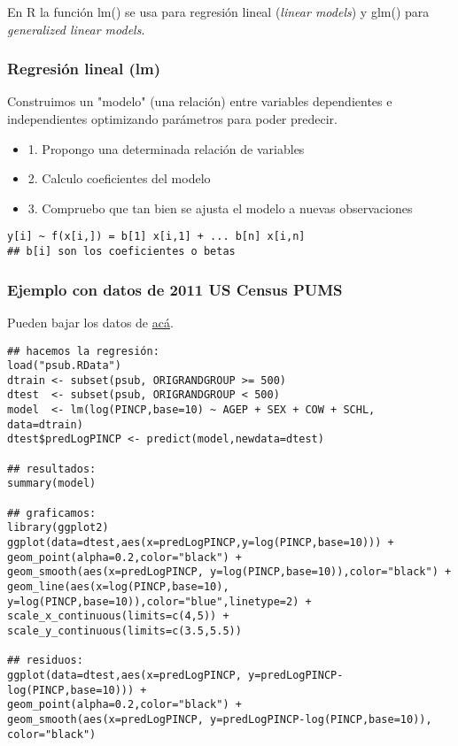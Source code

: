 \documentclass[11pt]{article}
\begin{document}
En R la función lm() se usa para regresión lineal (\emph{linear models}) y glm() para \emph{generalized linear models}.
\subsubsection*{Regresión lineal (lm)}
\label{sec:orgb3bc457}
Construimos un "modelo" (una relación) entre variables dependientes e independientes optimizando
parámetros para poder predecir.

\begin{itemize}
\item 1. Propongo una determinada relación de variables
\item 2. Calculo coeficientes del modelo
\item 3. Compruebo que tan bien se ajusta el modelo a nuevas observaciones
\end{itemize}

\begin{verbatim}
y[i] ~ f(x[i,]) = b[1] x[i,1] + ... b[n] x[i,n]
## b[i] son los coeficientes o betas
\end{verbatim}

\subsubsection*{Ejemplo con datos de 2011 US Census PUMS}
\label{sec:org3a5c616}

Pueden bajar los datos de \href{https://github.com/WinVector/zmPDSwR/raw/master/PUMS/psub.RData}{acá}.

\begin{verbatim}
## hacemos la regresión:
load("psub.RData")
dtrain <- subset(psub, ORIGRANDGROUP >= 500)
dtest  <- subset(psub, ORIGRANDGROUP < 500)
model  <- lm(log(PINCP,base=10) ~ AGEP + SEX + COW + SCHL, data=dtrain) 
dtest$predLogPINCP <- predict(model,newdata=dtest) 

## resultados:
summary(model)

## graficamos:
library(ggplot2)
ggplot(data=dtest,aes(x=predLogPINCP,y=log(PINCP,base=10))) + geom_point(alpha=0.2,color="black") + 
geom_smooth(aes(x=predLogPINCP, y=log(PINCP,base=10)),color="black") +
geom_line(aes(x=log(PINCP,base=10), y=log(PINCP,base=10)),color="blue",linetype=2) +
scale_x_continuous(limits=c(4,5)) +
scale_y_continuous(limits=c(3.5,5.5))

## residuos:
ggplot(data=dtest,aes(x=predLogPINCP, y=predLogPINCP-log(PINCP,base=10))) +
geom_point(alpha=0.2,color="black") +
geom_smooth(aes(x=predLogPINCP, y=predLogPINCP-log(PINCP,base=10)), color="black")

\end{verbatim}
\end{document}

